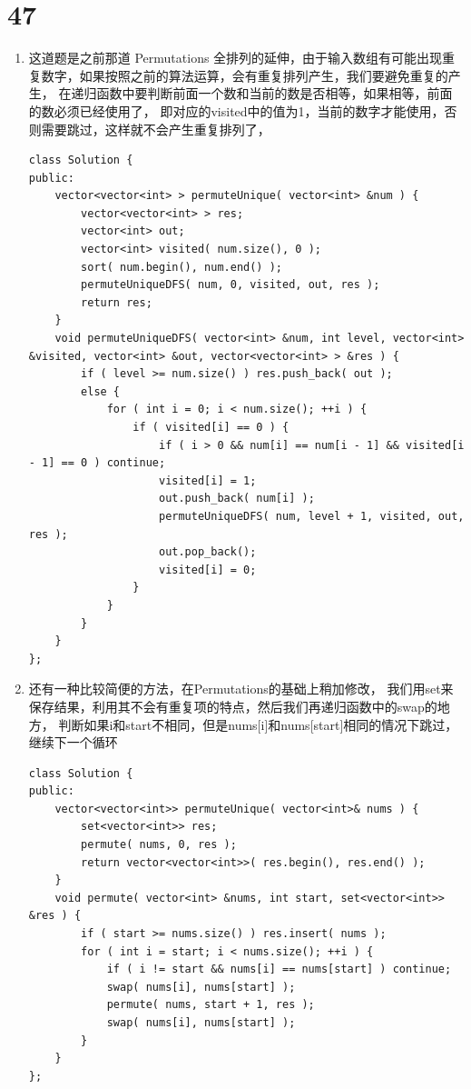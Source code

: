 \documentclass[12pt,a4paper]{article}
\begin{document}
\section{47}
\begin{enumerate}
\item
\begin{CJK}{UTF8}{gbsn}
这道题是之前那道 Permutations 全排列的延伸，由于输入数组有可能出现重复数字，如果按照之前的算法运算，会有重复排列产生，我们要避免重复的产生，
在递归函数中要判断前面一个数和当前的数是否相等，如果相等，前面的数必须已经使用了，
即对应的visited中的值为1，当前的数字才能使用，否则需要跳过，这样就不会产生重复排列了，
\end{CJK}
\begin{lstlisting}
class Solution {
public:
	vector<vector<int> > permuteUnique( vector<int> &num ) {
		vector<vector<int> > res;
		vector<int> out;
		vector<int> visited( num.size(), 0 );
		sort( num.begin(), num.end() );
		permuteUniqueDFS( num, 0, visited, out, res );
		return res;
	}
	void permuteUniqueDFS( vector<int> &num, int level, vector<int> &visited, vector<int> &out, vector<vector<int> > &res ) {
		if ( level >= num.size() ) res.push_back( out );
		else {
			for ( int i = 0; i < num.size(); ++i ) {
				if ( visited[i] == 0 ) {
					if ( i > 0 && num[i] == num[i - 1] && visited[i - 1] == 0 ) continue;
					visited[i] = 1;
					out.push_back( num[i] );
					permuteUniqueDFS( num, level + 1, visited, out, res );
					out.pop_back();
					visited[i] = 0;
				}
			}
		}
	}
};
\end{lstlisting}
\item
\begin{CJK}{UTF8}{gbsn}
还有一种比较简便的方法，在Permutations的基础上稍加修改，
我们用set来保存结果，利用其不会有重复项的特点，然后我们再递归函数中的swap的地方，
判断如果i和start不相同，但是nums[i]和nums[start]相同的情况下跳过，继续下一个循环
\end{CJK}
\begin{lstlisting}
class Solution {
public:
	vector<vector<int>> permuteUnique( vector<int>& nums ) {
		set<vector<int>> res;
		permute( nums, 0, res );
		return vector<vector<int>>( res.begin(), res.end() );
	}
	void permute( vector<int> &nums, int start, set<vector<int>> &res ) {
		if ( start >= nums.size() ) res.insert( nums );
		for ( int i = start; i < nums.size(); ++i ) {
			if ( i != start && nums[i] == nums[start] ) continue;
			swap( nums[i], nums[start] );
			permute( nums, start + 1, res );
			swap( nums[i], nums[start] );
		}
	}
};
\end{lstlisting}
\end{enumerate}
\end{document}
